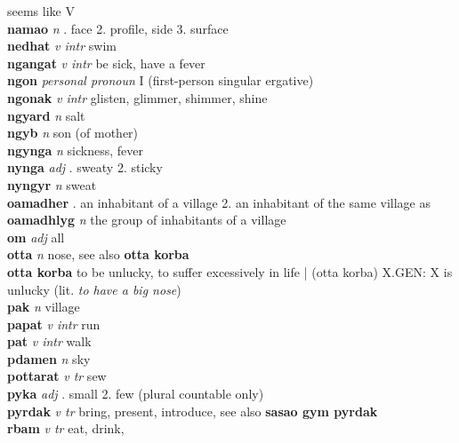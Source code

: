 seems like V\\\textbf{namao}   \emph{n} . face 2. profile, side 3. surface \\\textbf{nedhat}   \emph{v intr} \textperiodcentered swim\\\textbf{ngangat}   \emph{v intr} \textperiodcentered be sick, have a fever\\\textbf{ngon}   \emph{personal pronoun} \textperiodcentered I (first-person singular ergative)\\\textbf{ngonak}   \emph{v intr} \textperiodcentered glisten, glimmer, shimmer, shine\\\textbf{ngyard}   \emph{n} \textperiodcentered salt\\\textbf{ngyb}   \emph{n} \textperiodcentered son (of mother)\\\textbf{ngynga}   \emph{n} \textperiodcentered sickness, fever\\\textbf{nynga}   \emph{adj} . sweaty 2. sticky \\\textbf{nyngyr}   \emph{n} \textperiodcentered sweat\\\textbf{oamadher}    . an inhabitant of a village 2. an inhabitant of the same village as \GEN \\\textbf{oamadhlyg}   \emph{n} \textperiodcentered the group of inhabitants of a village\\\textbf{om}   \emph{adj} \textperiodcentered all\\\textbf{otta}   \emph{n} \textperiodcentered nose, see also \textbf{otta korba}\\\textbf{otta korba}    \textperiodcentered to be unlucky, to suffer excessively in life | (otta korba) X.GEN: X is unlucky (lit. \emph{to have a big nose})\\\textbf{pak}   \emph{n} \textperiodcentered village\\\textbf{papat}   \emph{v intr} \textperiodcentered run\\\textbf{pat}   \emph{v intr} \textperiodcentered walk\\\textbf{pdamen}   \emph{n} \textperiodcentered sky\\\textbf{pottarat}   \emph{v tr} \textperiodcentered sew\\\textbf{pyka}   \emph{adj} . small 2. few (plural countable only) \\\textbf{pyrdak}   \emph{v tr} \textperiodcentered bring, present, introduce, see also \textbf{sasao gym pyrdak}\\\textbf{rbam}   \emph{v tr} \textperiodcentered eat, drink, 